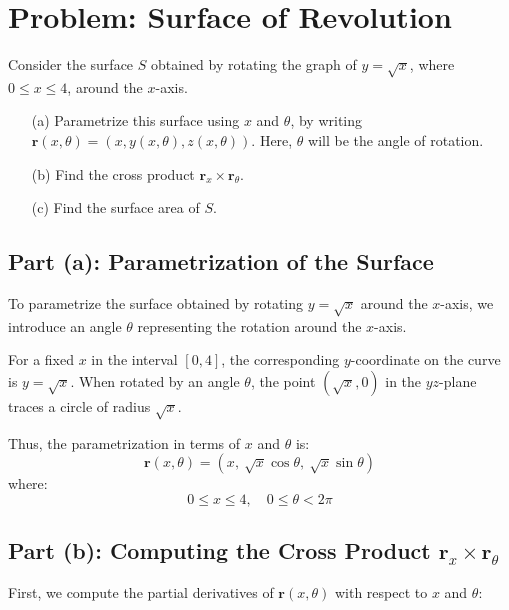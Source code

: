 \documentclass[11pt]{article}
\begin{document}
\newpage

\section{Problem: Surface of Revolution}

Consider the surface \( S \) obtained by rotating the graph of \( y = \sqrt{x} \), where \( 0 \leq x \leq 4 \), around the \( x \)-axis.

\begin{enumerate}
    \item[(a)] Parametrize this surface using \( x \) and \( \theta \), by writing \( \mathbf{r}(x, \theta) = (x, y(x,\theta), z(x,\theta)) \). Here, \( \theta \) will be the angle of rotation.

    \item[(b)] Find the cross product \( \mathbf{r}_x \times \mathbf{r}_\theta \).

    \item[(c)] Find the surface area of \( S \).
\end{enumerate}

\newpage

\subsection{Part (a): Parametrization of the Surface}

To parametrize the surface obtained by rotating \( y = \sqrt{x} \) around the \( x \)-axis, we introduce an angle \( \theta \) representing the rotation around the \( x \)-axis.

For a fixed \( x \) in the interval \( [0, 4] \), the corresponding \( y \)-coordinate on the curve is \( y = \sqrt{x} \). When rotated by an angle \( \theta \), the point \( (\sqrt{x}, 0) \) in the \( yz \)-plane traces a circle of radius \( \sqrt{x} \).

Thus, the parametrization in terms of \( x \) and \( \theta \) is:
\[
\mathbf{r}(x, \theta) = \left( x,\ \sqrt{x} \cos\theta,\ \sqrt{x} \sin\theta \right )
\]
where:
\[
0 \leq x \leq 4, \quad 0 \leq \theta < 2\pi
\]

\newpage

\subsection{Part (b): Computing the Cross Product \( \mathbf{r}_x \times \mathbf{r}_\theta \)}

First, we compute the partial derivatives of \( \mathbf{r}(x, \theta) \) with respect to \( x \) and \( \theta \):
\end{document}
